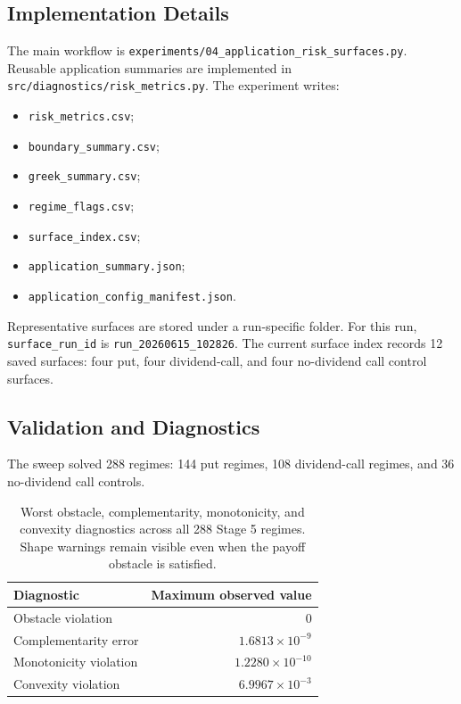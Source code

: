\documentclass[11pt]{article}
\begin{document}
\subsection{Implementation Details}
The main workflow is \texttt{experiments/04\_application\_risk\_surfaces.py}. Reusable application summaries are implemented in \texttt{src/diagnostics/risk\_metrics.py}. The experiment writes:
\begin{itemize}
  \item \texttt{risk\_metrics.csv};
  \item \texttt{boundary\_summary.csv};
  \item \texttt{greek\_summary.csv};
  \item \texttt{regime\_flags.csv};
  \item \texttt{surface\_index.csv};
  \item \texttt{application\_summary.json};
  \item \texttt{application\_config\_manifest.json}.
\end{itemize}
Representative surfaces are stored under a run-specific folder. For this run, \texttt{surface\_run\_id} is \texttt{run\_20260615\_102826}. The current surface index records 12 saved surfaces: four put, four dividend-call, and four no-dividend call control surfaces.

\subsection{Validation and Diagnostics}
The sweep solved 288 regimes: 144 put regimes, 108 dividend-call regimes, and 36 no-dividend call controls.

\begin{table}[h]
\centering
\begin{tabular}{lr}
\toprule
Diagnostic & Maximum observed value\\
\midrule
Obstacle violation & $0$\\
Complementarity error & $1.6813\times10^{-9}$\\
Monotonicity violation & $1.2280\times10^{-10}$\\
Convexity violation & $6.9967\times10^{-3}$\\
\bottomrule
\end{tabular}
\caption{Worst obstacle, complementarity, monotonicity, and convexity diagnostics across all 288 Stage 5 regimes. Shape warnings remain visible even when the payoff obstacle is satisfied.}
\end{table}
\end{document}
